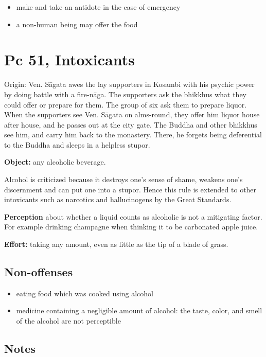 \begin{itemize}
\tightlist
\item
  make and take an antidote in the case of emergency
\item
  a non-human being may offer the food
\end{itemize}

\section{Pc 51, Intoxicants}

Origin: Ven. Sāgata awes the lay supporters in Kosambi with his psychic
power by doing battle with a fire-nāga. The supporters ask the bhikkhus
what they could offer or prepare for them. The group of six ask them to
prepare liquor. When the supporters see Ven. Sāgata on alms-round, they
offer him liquor house after house, and he passes out at the city gate.
The Buddha and other bhikkhus see him, and carry him back to the
monastery. There, he forgets being deferential to the Buddha and sleeps
in a helpless stupor.

\textbf{Object:} any alcoholic beverage.

Alcohol is criticized because it destroys one's sense of shame, weakens
one's discernment and can put one into a stupor. Hence this rule is
extended to other intoxicants such as narcotics and hallucinogens by the
Great Standards.

\textbf{Perception} about whether a liquid counts as alcoholic is not a
mitigating factor. For example drinking champagne when thinking it to be
carbonated apple juice.

\textbf{Effort:} taking any amount, even as little as the tip of a blade
of grass.

\subsection{Non-offenses}

\begin{itemize}
\tightlist
\item
  eating food which was cooked using alcohol
\item
  medicine containing a negligible amount of alcohol: the taste, color,
  and smell of the alcohol are not perceptible
\end{itemize}

\subsection{Notes}

